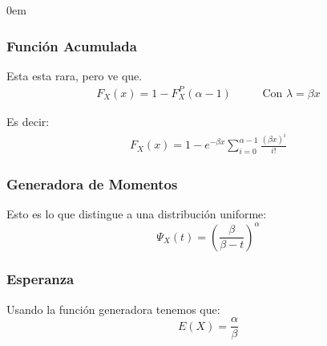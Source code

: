 \documentclass[12pt, fleqn]{report}                             %
\newenvironment{SmallIndentation}[1][0.75em]                    %
        {\begin{adjustwidth}{#1}{}\begin{footnotesize}}             %
        {\end{footnotesize}\end{adjustwidth}}                       %
\DeclareMathOperator \MegaSpace {\quad \quad}                   %
\theoremstyle{break}                                            %
\newcommand{\Wrap}[1]{\left( #1 \right)}                        %
\newcommand{\pfrac}[2]{\Wrap{\dfrac{#1}{#2}}}                   %
\begin{document}
\begin{multicols}{2}
\begin{SmallIndentation}[0em]
                    \subsubsection{Función Acumulada}

                        Esta esta rara, pero ve que.
                        \begin{align*}
                            F_X(x) = 1 - F_X^P (\alpha - 1) \MegaSpace \text{Con $\lambda = \beta x$}
                        \end{align*}

                        Es decir:
                        \begin{align*}
                            F_X(x) = 1 - e^{-\beta x} \sum_{i = 0}^{\alpha - 1} \frac{(\beta x)^i}{i!}
                        \end{align*}


                    \subsubsection{Generadora de Momentos}

                        Esto es lo que distingue a una distribución uniforme:
                        \begin{equation*}
                            \Psi_X(t) = \pfrac{\beta}{\beta - t}^\alpha
                        \end{equation*}

                    \subsubsection{Esperanza}

                        Usando la función generadora tenemos que:
                        \begin{equation*}
                            E(X) = \dfrac{\alpha}{\beta}
                        \end{equation*}



\end{SmallIndentation}
\end{multicols}
\end{document}
